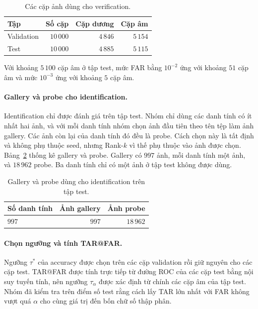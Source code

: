 \documentclass[a4paper,12pt]{article}
\begin{document}
\begin{table}[ht]
    \centering
    \caption{Các cặp ảnh dùng cho verification.}
    \label{tab:eval-ver}
    \begin{tabular}{lrrr}
        \toprule
        Tập        & Số cặp    & Cặp dương & Cặp âm   \\
        \midrule
        Validation & $10\,000$ & $4\,846$  & $5\,154$ \\
        Test       & $10\,000$ & $4\,885$  & $5\,115$ \\
        \bottomrule
    \end{tabular}
\end{table}

Với khoảng $5\,100$ cặp âm ở tập test, mức FAR bằng $10^{-2}$ ứng với khoảng $51$ cặp âm và mức $10^{-3}$ ứng với khoảng $5$ cặp âm.

\paragraph{Gallery và probe cho identification.} Identification chỉ được đánh giá trên tập test. Nhóm chỉ dùng các danh tính có ít nhất hai ảnh, và với mỗi danh tính nhóm chọn ảnh đầu tiên theo tên tệp làm ảnh gallery. Các ảnh còn lại của danh tính đó đều là probe. Cách chọn này là tất định và không phụ thuộc seed, nhưng Rank-$k$ vì thế phụ thuộc vào ảnh được chọn. Bảng~\ref{tab:eval-ident} thống kê gallery và probe. Gallery có $997$ ảnh, mỗi danh tính một ảnh, và $18\,962$ probe. Ba danh tính chỉ có một ảnh ở tập test không được dùng.

\begin{table}[ht]
    \centering
    \caption{Gallery và probe dùng cho identification trên tập test.}
    \label{tab:eval-ident}
    \begin{tabular}{lrr}
        \toprule
        Số danh tính & Ảnh gallery & Ảnh probe \\
        \midrule
        $997$        & $997$       & $18\,962$ \\
        \bottomrule
    \end{tabular}
\end{table}

\paragraph{Chọn ngưỡng và tính TAR@FAR.} Ngưỡng $\tau^\ast$ của accuracy được chọn trên các cặp validation rồi giữ nguyên cho các cặp test. TAR@FAR được tính trực tiếp từ đường ROC của các cặp test bằng nội suy tuyến tính, nên ngưỡng $\tau_\alpha$ được xác định từ chính các cặp âm của tập test. Nhóm đã kiểm tra trên điểm số test rằng cách lấy TAR lớn nhất với FAR không vượt quá $\alpha$ cho cùng giá trị đến bốn chữ số thập phân.
\end{document}
